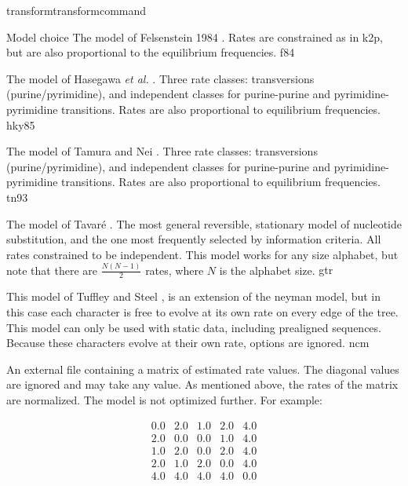 \begin{command}{transform}{transformcommand}
\begin{arguments}
\begin {argumentgroup} {Model choice}
{The model of Felsenstein 1984 \cite{felsenstein1980}. Rates
are constrained as in k2p, but are also proportional to
the equilibrium frequencies.}
{f84}

{The model of Hasegawa \emph{et al.} \cite{hasegawa1984}. 
Three rate classes:
transversions (purine/pyrimidine), and independent
classes for purine-purine and pyrimidine-pyrimidine
transitions. Rates are also proportional to equilibrium
frequencies.}
{hky85}

{The model of Tamura and Nei \cite{tamura1993}. Three
rate classes: transversions (purine/pyrimidine), and
independent classes for purine-purine and
pyrimidine-pyrimidine transitions. Rates are also
proportional to equilibrium frequencies.}
{tn93}

{The model of Tavar\'{e} \cite{tavare1986}. The most general
reversible, stationary model of nucleotide substitution,
and the one most frequently selected by information
criteria. All rates constrained to be independent. This
model works for any size alphabet, but note that there
are $\frac{N (N-1)}{2}$ rates, where $N$ is the alphabet
size.}
{gtr}

{This model of Tuffley and Steel \cite{tuffleyandsteel1998}, is an 
extension of the neyman model, but in this case each character is 
free to evolve at its own rate on every edge of the tree. This 
model can only be used with static data, including prealigned sequences. 
Because these characters evolve at their own rate,  
options are ignored.}
{ncm}

{An external file containing a matrix of estimated rate
values. The diagonal values are ignored and may take any
value. As mentioned above, the rates of the matrix are
normalized. The model is not optimized further. For example:

\begin{equation*}
\begin{array}{ccccc}
0.0 & 2.0 & 1.0 & 2.0 & 4.0 \\
2.0 & 0.0 & 0.0 & 1.0 & 4.0 \\
1.0 & 2.0 & 0.0 & 2.0 & 4.0 \\
2.0 & 1.0 & 2.0 & 0.0 & 4.0 \\
4.0 & 4.0 & 4.0 & 4.0 & 0.0
\end{array}
\end{equation*} 

}
\end{argumentgroup}
\end{arguments}
\end{command}
